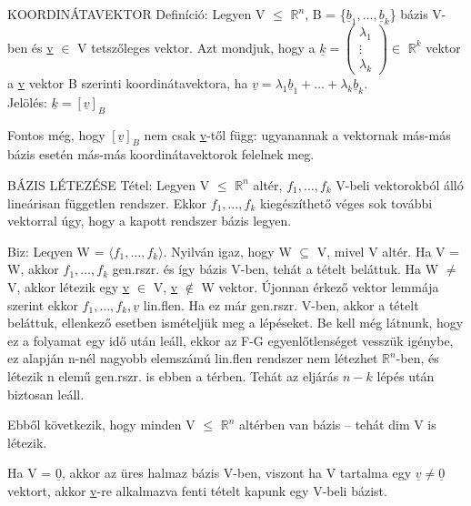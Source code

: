 \documentclass[]{article}
\newcommand{\Rn}[1]{$\mathbb{R}^{#1}$}
\newcommand{\Und}[1]{\underline{#1}}
\begin{document}
\begin{shaded}
KOORDINÁTAVEKTOR Definíció: Legyen V $\leq$ \Rn{n}, B = \{$\Und{b}_1,\ldots,\Und{b}_k$\} bázis V-ben és \Und{v} $\in$ V tetszőleges vektor. Azt mondjuk, hogy a $\Und{k} = \begin{pmatrix}
\lambda_1\\
\vdots\\
\lambda_k
\end{pmatrix}\in$ \Rn{k} vektor a \Und{v} vektor B szerinti koordinátavektora, ha $\Und{v} = \lambda_1\Und{b}_1 + \ldots + \lambda_k\Und{b}_k$.\\
Jelölés: $\Und{k} = [\Und{v}]_B$
\end{shaded}
Fontos még, hogy $[\Und{v}]_B$ nem csak \Und{v}-től függ: ugyanannak a vektornak más-más bázis esetén más-más koordinátavektorok felelnek meg.
\begin{framed}
BÁZIS LÉTEZÉSE Tétel: Legyen V $\leq$ \Rn{n} altér, $f_1, \ldots, f_k$ V-beli vektorokból álló lineárisan független rendszer. Ekkor $f_1, \ldots, f_k$ kiegészíthető véges sok további vektorral úgy, hogy a kapott rendszer bázis legyen.
\end{framed}
\begin{leftbar}
Biz: Leqyen W = $\langle f_1, \ldots, f_k \rangle$. Nyilván igaz, hogy W $\subseteq$ V, mivel V altér. Ha V = W, akkor $f_1, \ldots, f_k$ gen.rszr. és így bázis V-ben, tehát a tételt beláttuk. Ha W $\neq$ V, akkor létezik egy \Und{v} $\in$ V, \Und{v} $\notin$ W vektor. Újonnan érkező vektor lemmája szerint ekkor $f_1, \ldots, f_k, \Und{v}$ lin.flen. Ha ez már gen.rszr. V-ben, akkor a tételt beláttuk, ellenkező esetben ismételjük meg a lépéseket. Be kell még látnunk, hogy ez a folyamat egy idő után leáll, ekkor az F-G egyenlőtlenséget vesszük igénybe, ez alapján n-nél nagyobb elemszámú lin.flen rendszer nem létezhet \Rn{n}-ben, és létezik n elemű gen.rszr. is ebben a térben. Tehát az eljárás $n-k$ lépés után biztosan leáll.
\end{leftbar}
Ebből következik, hogy minden V $\leq$ \Rn{n} altérben van bázis -- tehát dim V is létezik.
\begin{leftbar}
Ha V = ${\Und{0}}$, akkor az üres halmaz bázis V-ben, viszont ha V tartalma egy $\Und{v} \neq \Und{0}$ vektort, akkor \Und{v}-re alkalmazva fenti tételt kapunk egy V-beli bázist.
\end{leftbar}
\end{document}
